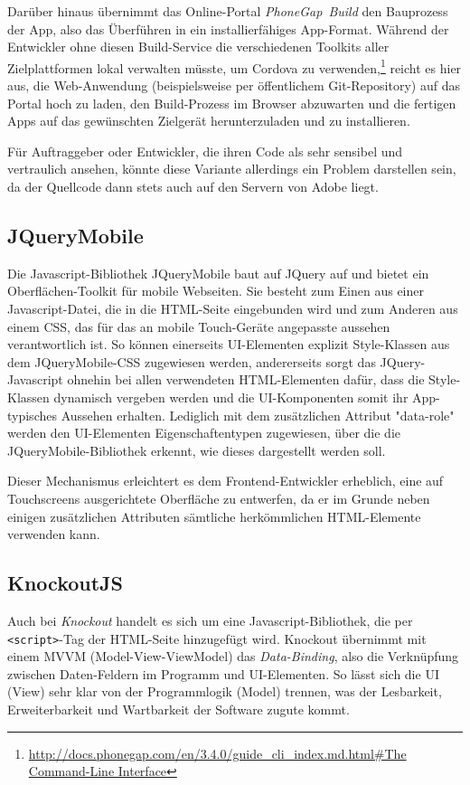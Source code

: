 \documentclass{scrreprt}
\begin{document}
Darüber hinaus übernimmt das Online-Portal \emph{PhoneGap~Build} den Bauprozess der App, also das Überführen in ein installierfähiges App-Format. 
Während der Entwickler ohne diesen Build-Service die verschiedenen Toolkits aller Zielplattformen lokal verwalten müsste, um Cordova zu verwenden,\footnote{\url{http://docs.phonegap.com/en/3.4.0/guide_cli_index.md.html\#The Command-Line Interface} %
} reicht es hier aus, die Web-Anwendung (beispielsweise per öffentlichem Git-Repository) auf das Portal hoch zu laden, den Build-Prozess im Browser abzuwarten und die fertigen Apps auf das gewünschten Zielgerät herunterzuladen und zu installieren. 

Für Auftraggeber oder Entwickler, die ihren Code als sehr sensibel und vertraulich ansehen, könnte diese Variante allerdings ein Problem darstellen sein, da der Quellcode dann stets auch auf den Servern von Adobe liegt.

\subsection{JQueryMobile}
Die Javascript-Bibliothek JQueryMobile baut auf JQuery auf und bietet ein Oberflächen-Toolkit für mobile Webseiten. Sie besteht zum Einen aus einer Javascript-Datei, die in die HTML-Seite eingebunden wird und zum Anderen aus einem CSS, das für das an mobile Touch-Geräte angepasste aussehen verantwortlich ist. 
So können einerseits UI-Elementen explizit Style-Klassen aus dem JQueryMobile-CSS zugewiesen werden, andererseits sorgt das JQuery-Javascript ohnehin bei allen verwendeten HTML-Elementen dafür, dass die Style-Klassen dynamisch vergeben werden und die UI-Komponenten somit ihr App-typisches Aussehen erhalten.
Lediglich mit dem zusätzlichen Attribut "data-role" werden den UI-Elementen Eigenschaftentypen zugewiesen, über die die JQueryMobile-Bibliothek erkennt, wie dieses dargestellt werden soll.

Dieser Mechanismus erleichtert es dem Frontend-Entwickler erheblich, eine auf Touchscreens ausgerichtete Oberfläche zu entwerfen, da er im Grunde neben einigen zusätzlichen Attributen sämtliche herkömmlichen HTML-Elemente verwenden kann. 

\subsection{KnockoutJS}
Auch bei \emph{Knockout} handelt es sich um eine Javascript-Bibliothek, die per \mbox{\texttt{<script>}-Tag} der HTML-Seite hinzugefügt wird. Knockout übernimmt mit einem MVVM (Model-View-ViewModel) das \emph{Data-Binding}, also die Verknüpfung zwischen Daten-Feldern im Programm und UI-Elementen.
So lässt sich die UI (View) sehr klar von der Programmlogik (Model) trennen, was der Lesbarkeit, Erweiterbarkeit und Wartbarkeit der Software zugute kommt.
\end{document}

